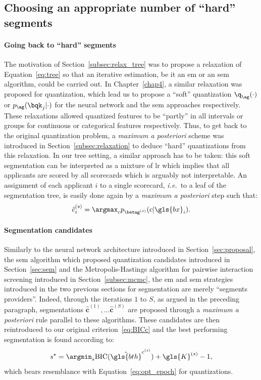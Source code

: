 \subsection{Choosing an appropriate number of ``hard'' segments} \label{subsec:hard_seg}

\paragraph{Going back to ``hard'' segments}
The motivation of Section~\ref{subsec:relax_tree} was to propose a relaxation of Equation~\eqref{eq:tree} so that an iterative estimation, be it an \gls{em} or an \gls{sem} algorithm, could be carried out. In Chapter~\ref{chap4}, a similar relaxation was proposed for quantization, which lead us to propose a ``soft'' quantization $\q_{\ag}(\cdot)$ or $p_{\ag}(\bqk_j | \cdot)$ for the neural network and the \gls{sem} approaches respectively. These relaxations allowed quantized features to be ``partly'' in all intervals or groups for continuous or categorical features respectively. Thus, to get back to the original quantization problem, a \textit{maximum a posteriori} scheme was introduced in Section~\ref{subsec:relaxation} to deduce ``hard'' quantizations from this relaxation. In our tree setting, a similar approach has to be taken: this soft segmentation can be interpreted as a mixture of \gls{lr} which implies that all applicants are scored by all scorecards which is arguably not interpretable. An assignment of each applicant $i$ to a single scorecard, \textit{i.e.}\ to a leaf of the segmentation tree, is easily done again by a \textit{maximum a posteriori} step such that:
\begin{equation} \label{eq:max_seg}
\hat{c}_i^{(s)} = \argmax_c p_{\betag^{(s)}}(c | \gls{bx}_i).
\end{equation}

\paragraph{Segmentation candidates}
Similarly to the neural network architecture introduced in Section~\ref{sec:proposal}, the \gls{sem} algorithm which proposed quantization candidates introduced in Section~\ref{sec:sem} and the Metropolis-Hastings algorithm for pairwise interaction screening introduced in Section~\ref{subsec:mcmc}, the \gls{em} and \gls{sem} strategies introduced in the two previous sections for segmentation are merely ``segments providers''. Indeed, through the iterations $1$ to $S$, as argued in the preceding paragraph, segmentations $\hat{\mathbf{c}}^{(1)}, \dots \hat{\mathbf{c}}^{(S)}$ are proposed through a \textit{maximum a posteriori} rule parallel to these algorithms. These candidates are then reintroduced to our original criterion~\eqref{eq:BICc} and the best performing segmentation is found according to:
\begin{equation} \label{eq:BICtree}
s^\star = \argmin_s \text{BIC}(\hat{\gls{bth}}^{c^{(s)}}) + \gls{K}^{(s)} - 1,
\end{equation}
which bears resemblance with Equation~\eqref{eq:opt_epoch} for quantizations.

